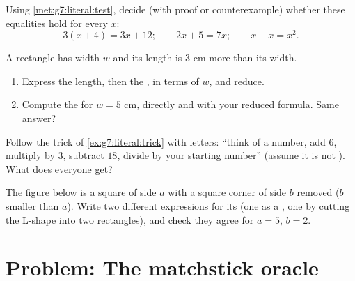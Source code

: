 \begin{exercise}[$\star\star$]\label{exo:g7:literal:8}
Using \cref{met:g7:literal:test}, decide (with proof or
counterexample) whether these equalities hold for every $x$:
\[
3(x + 4) = 3x + 12; \qquad
2x + 5 = 7x; \qquad
x + x = x^2 .
\]
\end{exercise}

\begin{exercise}[$\star\star$]\label{exo:g7:literal:9}
A rectangle has width $w$ and its length is $3$ cm more than its
width.
\begin{enumerate}
  \item Express the length, then the , in terms of $w$, and
        reduce.
  \item Compute the  for $w = 5$ cm, directly and with your
        reduced formula. Same answer?
\end{enumerate}
\end{exercise}

\begin{exercise}[$\star\star$]\label{exo:g7:literal:10}
Follow the trick of \cref{ex:g7:literal:trick} with letters: ``think
of a number, add $6$, multiply by $3$, subtract $18$, divide by your
starting number'' (assume it is not ). What does everyone get?
\end{exercise}

\begin{exercise}[$\star\star\star$]\label{exo:g7:literal:11}
The figure below is a square of side $a$ with a square corner of side
$b$ removed ($b$ smaller than $a$). Write two different expressions
for its  (one as a , one by cutting the L-shape into two
rectangles), and check they agree for $a = 5$, $b = 2$.
\end{exercise}

\section{Problem: The matchstick oracle}

